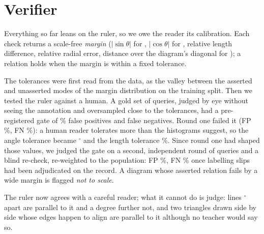 \section{Verifier}
\label{sec:verifier}

Everything so far leans on the ruler, so we owe the reader its calibration. Each check returns a scale-free \emph{margin} ($|\sin\theta|$ for , $|\cos\theta|$ for , relative length difference, relative radial error, distance over the diagram's diagonal for ); a relation holds when the margin is within a fixed tolerance.

The tolerances were first read from the data, as the valley between the asserted and unasserted modes of the margin distribution on the training split. Then we tested the ruler against a human. A gold set of \nGoldRoundOne{} queries, judged by eye without seeing the annotation and oversampled close to the tolerances, had a pre-registered gate of \goldCeilingPct\% false positives and false negatives. Round one failed it (FP \pctGoldRoundOneFP\%, FN \pctGoldRoundOneFN\%): a human reader tolerates more than the histograms suggest, so the angle tolerance became \tolParallelDeg$^\circ$ and the length tolerance \tolEqualLengthPct\%. Since round one had shaped those values, we judged the gate on a second, independent round of \nGoldRoundTwo{} queries and a blind re-check, re-weighted to the population: FP \pctGoldRoundTwoAdjFP\%, FN \pctGoldRoundTwoAdjFN\% once \nGoldAdjudicated{} labelling slips had been adjudicated on the record. A diagram whose asserted relation fails by a wide margin is flagged \emph{not to scale}.

The ruler now agrees with a careful reader; what it cannot do is judge: lines \tolParallelDeg$^\circ$ apart are parallel to it and a degree further not, and two triangles drawn side by side whose edges happen to align are parallel to it although no teacher would say so.
